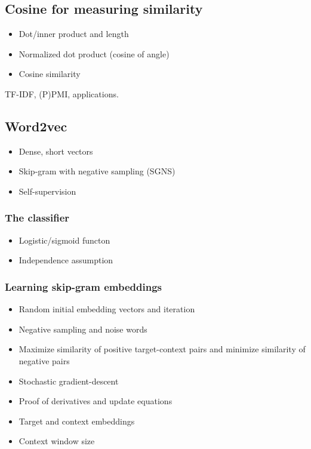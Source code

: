 \subsection{Cosine for measuring similarity}

\begin{itemize}
  \item Dot/inner product and length
  \item Normalized dot product (cosine of angle)
  \item Cosine similarity
\end{itemize}

TF-IDF, (P)PMI, applications.

\subsection{Word2vec}

\begin{itemize}
  \item Dense, short vectors
  \item Skip-gram with negative sampling (SGNS)
  \item Self-supervision
\end{itemize}

\subsubsection{The classifier}

\begin{itemize}
  \item Logistic/sigmoid functon
  \item Independence assumption
\end{itemize}

\subsubsection{Learning skip-gram embeddings}

\begin{itemize}
  \item Random initial embedding vectors and iteration
  \item Negative sampling and noise words
  \item Maximize similarity of positive target-context pairs and minimize similarity of negative pairs
  \item Stochastic gradient-descent
  \item Proof of derivatives and update equations
  \item Target and context embeddings
  \item Context window size
\end{itemize}

